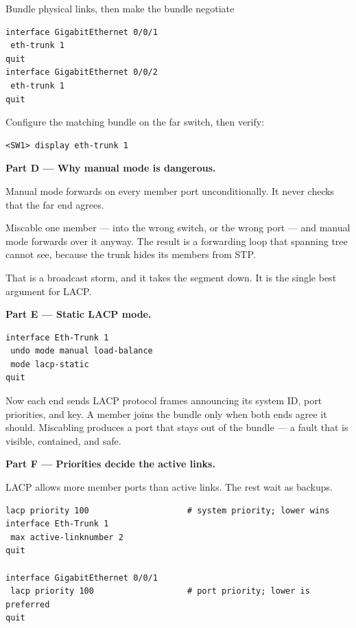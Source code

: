 \begin{labproject}{Bundle physical links, then make the bundle negotiate}
\begin{lstlisting}[style=dcnterminal]
interface GigabitEthernet 0/0/1
 eth-trunk 1
quit
interface GigabitEthernet 0/0/2
 eth-trunk 1
quit
\end{lstlisting}

Configure the matching bundle on the far switch, then verify:

\begin{lstlisting}[style=dcnterminal]
<SW1> display eth-trunk 1
\end{lstlisting}

\medskip\noindent\textbf{Part D --- Why manual mode is dangerous.}\par
Manual mode forwards on every member port unconditionally. It never checks that the far end agrees.

\begin{keyidea}
Miscable one member --- into the wrong switch, or the wrong port --- and manual mode forwards over it anyway. The result is a forwarding loop that spanning tree cannot see, because the trunk hides its members from STP.

That is a broadcast storm, and it takes the segment down. It is the single best argument for LACP.
\end{keyidea}

\medskip\noindent\textbf{Part E --- Static LACP mode.}\par

\begin{lstlisting}[style=dcnterminal]
interface Eth-Trunk 1
 undo mode manual load-balance
 mode lacp-static
quit
\end{lstlisting}

Now each end sends LACP protocol frames announcing its system ID, port priorities, and key. A member joins the bundle only when both ends agree it should. Miscabling produces a port that stays out of the bundle --- a fault that is visible, contained, and safe.

\medskip\noindent\textbf{Part F --- Priorities decide the active links.}\par
LACP allows more member ports than active links. The rest wait as backups.

\begin{lstlisting}[style=dcnterminal]
lacp priority 100                    # system priority; lower wins
interface Eth-Trunk 1
 max active-linknumber 2
quit

interface GigabitEthernet 0/0/1
 lacp priority 100                   # port priority; lower is preferred
quit
\end{lstlisting}


\end{labproject}
